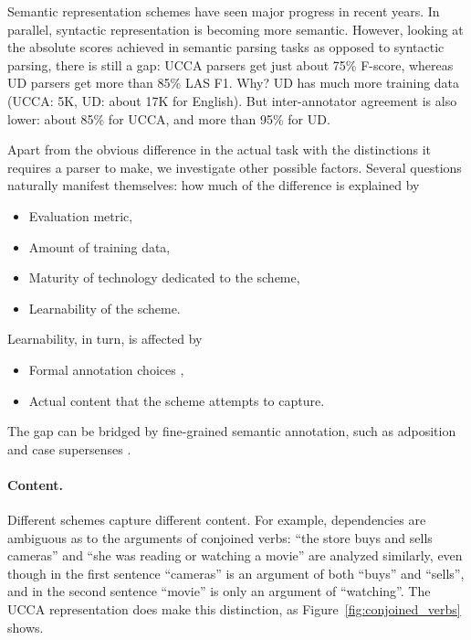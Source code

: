 \documentclass[11pt,a4paper]{article}
\begin{document}
Semantic representation schemes have seen major progress in recent years.
In parallel, syntactic representation is becoming more semantic.
However, looking at the absolute scores achieved in semantic parsing tasks
as opposed to syntactic parsing,
there is still a gap:
UCCA parsers get just about 75\% F-score, whereas UD parsers get more than 85\% LAS F1. Why?
UD has much more training data (UCCA: 5K, UD: about 17K for English).
But inter-annotator agreement is also lower: about 85\% for UCCA, and more than 95\% for UD.

Apart from the obvious difference in the actual task with the distinctions it requires a parser to make,
we investigate other possible factors.
Several questions naturally manifest themselves:
how much of the difference is explained by
\begin{itemize}
\item Evaluation metric,
\item Amount of training data,
\item Maturity of technology dedicated to the scheme,
\item Learnability of the scheme.
\end{itemize}

Learnability, in turn, is affected by
\begin{itemize}
\item Formal annotation choices \cite{Schwartz:12},
\item Actual content that the scheme attempts to capture.
\end{itemize}


The gap can be bridged by fine-grained semantic annotation,
such as adposition and case supersenses
\cite{schneider2017adposition,blodgett2018semantic}.

\paragraph{Content.}

Different schemes capture different content.
For example, dependencies are ambiguous as to the arguments of conjoined verbs:
``the store buys and sells cameras'' and ``she was reading or watching a movie''
are analyzed similarly, even though in the first sentence ``cameras'' is an argument
of both ``buys'' and ``sells'', and in the second sentence ``movie'' is only an argument
of ``watching''.
The UCCA representation does make this distinction, as Figure~\ref{fig:conjoined_verbs} shows.
\end{document}
